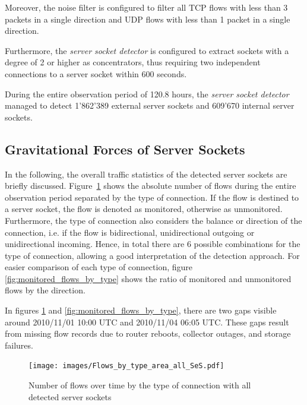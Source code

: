 Moreover, the noise filter is configured to filter all \gls{TCP} flows with less
than 3 packets in a single direction and \gls{UDP} flows with less than 1 packet
in a single direction.

Furthermore, the \emph{server socket detector} is configured to extract sockets
with a degree of 2 or higher as concentrators, thus requiring two independent
connections to a \gls{server socket} within 600 seconds.

During the entire observation period of 120.8 hours, the
\emph{server socket detector} managed to detect 1'862'389 external
\glspl{server socket} and 609'670 internal \glspl{server socket}.

\subsection{Gravitational Forces of Server Sockets}
In the following, the overall traffic statistics of the detected
\glspl{server socket} are briefly discussed. Figure \ref{fig:flows_by_type}
shows the absolute number of flows during the entire observation period
separated by the type of connection. If the flow is destined to a
\gls{server socket}, the flow is denoted as monitored, otherwise as unmonitored.
Furthermore, the type of connection also considers the balance or direction of
the connection, i.e. if the flow is bidirectional, unidirectional outgoing or
unidirectional incoming. Hence, in total there are 6 possible combinations for
the type of connection, allowing a good interpretation of the detection
approach. For easier comparison of each type of connection, figure
\ref{fig:monitored_flows_by_type} shows the ratio of monitored and unmonitored
flows by the direction.

In figures \ref{fig:flows_by_type} and \ref{fig:monitored_flows_by_type}, there
are two gaps visible around 2010/11/01 10:00 UTC and 2010/11/04 06:05 UTC. These
gaps result from missing flow records due to router reboots, collector outages,
and storage failures\citep{Schatzmann:Mining}.

\begin{figure}
	[ht] \centering
	\texttt{[image: images/Flows\_by\_type\_area\_all\_SeS.pdf]}
	\caption{Number of flows over time by the type of connection with all detected server sockets}
	\label{fig:flows_by_type}
\end{figure}

